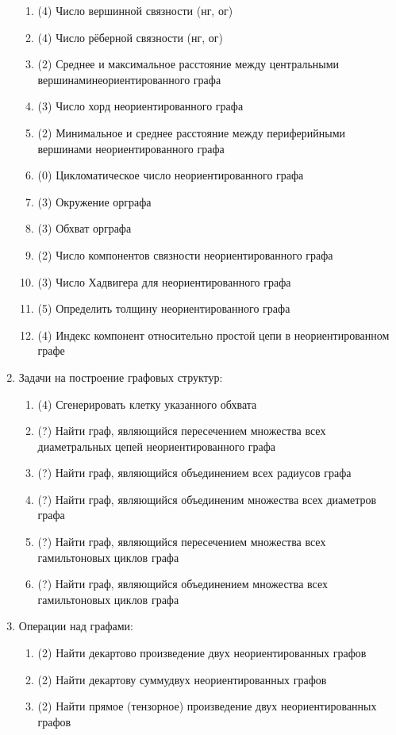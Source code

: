 \begin{enumerate}
\begin{enumerate}[1.]
  \item (4) Число вершинной связности (нг, ог)
  \item (4) Число рёберной связности (нг, ог)
  \item (2) Среднее и максимальное расстояние между центральными вершинаминеориентированного графа  
  \item (3) Число хорд неориентированного графа 
  \item (2) Минимальное и среднее расстояние между периферийными вершинами неориентированного графа  
  \item (0) Цикломатическое число неориентированного графа  
  \item (3) Окружение орграфа  
  \item (3) Обхват орграфа  
  \item (2) Число компонентов связности неориентированного графа  
  \item (3) Число Хадвигера для неориентированного графа 
  \item (5) Определить толщину неориентированного графа 
  \item (4) Индекс компонент относительно простой цепи в неориентированном графе 
  \end{enumerate}
\item Задачи на построение графовых структур:
  \begin{enumerate}[1.]
  \item (4) Сгенерировать клетку указанного обхвата  
  \item (?) Найти граф, являющийся пересечением множества всех диаметральных цепей неориентированного графа  
  \item (?) Найти граф, являющийся объединением всех радиусов графа  
  \item (?) Найти граф, являющийся объединеним множества всех диаметров графа  
  \item (?) Найти граф, являющийся пересечением множества всех гамильтоновых циклов графа  
  \item (?) Найти граф, являющийся объединением множества всех гамильтоновых циклов графа  
  \end{enumerate}
\item Операции над графами:
  \begin{enumerate}[1.]
  \item (2) Найти декартово произведение двух неориентированных графов 
  \item (2) Найти декартову суммудвух неориентированных графов 
  \item (2) Найти прямое (тензорное) произведение двух неориентированных графов 

\end{enumerate}
\end{enumerate}
